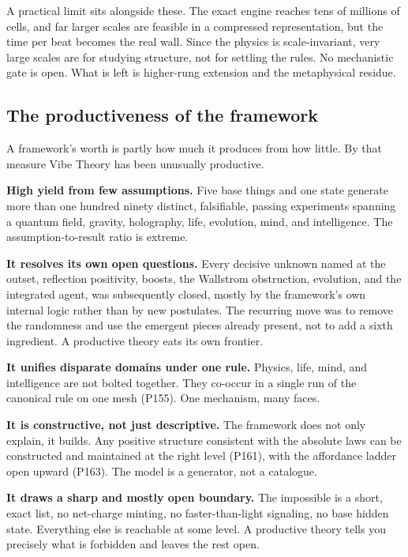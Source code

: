 A practical limit sits alongside these. The exact engine reaches tens of millions of cells, and far larger
scales are feasible in a compressed representation, but the time per beat becomes the real wall. Since the
physics is scale-invariant, very large scales are for studying structure, not for settling the rules. No
mechanistic gate is open. What is left is higher-rung extension and the metaphysical residue.

\subsection{The productiveness of the framework}

A framework's worth is partly how much it produces from how little. By that measure Vibe Theory has been
unusually productive.

\textbf{High yield from few assumptions.} Five base things and one state generate more than one hundred ninety
distinct, falsifiable, passing experiments spanning a quantum field, gravity, holography, life, evolution,
mind, and intelligence. The assumption-to-result ratio is extreme.

\textbf{It resolves its own open questions.} Every decisive unknown named at the outset, reflection
positivity, boosts, the Wallstrom obstruction, evolution, and the integrated agent, was subsequently closed,
mostly by the framework's own internal logic rather than by new postulates. The recurring move was to remove
the randomness and use the emergent pieces already present, not to add a sixth ingredient. A productive theory
eats its own frontier.

\textbf{It unifies disparate domains under one rule.} Physics, life, mind, and intelligence are not bolted
together. They co-occur in a single run of the canonical rule on one mesh (P155). One mechanism, many faces.

\textbf{It is constructive, not just descriptive.} The framework does not only explain, it builds. Any
positive structure consistent with the absolute laws can be constructed and maintained at the right level
(P161), with the affordance ladder open upward (P163). The model is a generator, not a catalogue.

\textbf{It draws a sharp and mostly open boundary.} The impossible is a short, exact list, no net-charge
minting, no faster-than-light signaling, no base hidden state. Everything else is reachable at some level.
A productive theory tells you precisely what is forbidden and leaves the rest open.

